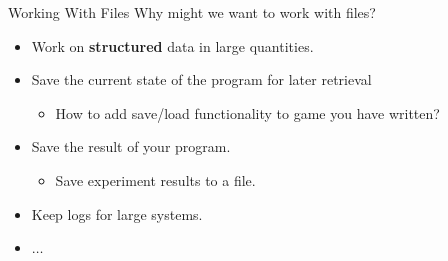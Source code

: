     \begin{frame}{Working With Files}
        \LARGE
        Why might we want to work with files?
        \begin{itemize}
            \pause
            \item Work on \textbf{structured} data in large quantities.
            \pause
            \item Save the current state of the program for later retrieval
            \begin{itemize}
                \Large
                \pause
                \item How to add save/load functionality to game you have written?
            \end{itemize}
            \item Save the result of your program.
            \begin{itemize}
                \Large
                \pause
                \item Save experiment results to a file.
            \end{itemize}
            \pause
            \item Keep logs for large systems.
            \pause
            \item $\dots$
        \end{itemize}
    \end{frame}

